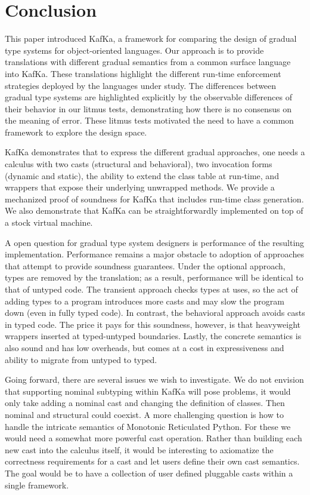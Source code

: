 \documentclass[a4paper,USenglish]{lipics-v2018}
\newcommand{\kafka}{{\sf KafKa}\xspace}
\newcounter{lem}
\begin{document}
\section{Conclusion}

This paper introduced \kafka, a framework for comparing the design of
gradual type systems for object-oriented languages. Our approach is to provide
translations with different gradual semantics from a common surface language
into \kafka. These translations highlight the different run-time enforcement
strategies deployed by the languages under study. The differences between
gradual type systems are highlighted explicitly by the observable differences
of their behavior in our litmus tests, demonstrating how there is no consensus
on the meaning of error. These litmus tests motivated the need to have a
common framework to explore the design space.

\kafka demonstrates that to express the different gradual approaches, one
needs a calculus with two casts (structural and behavioral), two
invocation forms (dynamic and static), the ability to extend the
class table at run-time, and wrappers that expose their underlying
unwrapped methods. We provide a mechanized proof of soundness for \kafka
that includes run-time class generation. We also demonstrate that \kafka
can be straightforwardly implemented on top of a stock virtual machine.

\enlargethispage{-1\baselineskip}
A open question for gradual type system designers is performance of the
resulting implementation. Performance remains a major obstacle to adoption
of approaches that attempt to provide soundness guarantees. Under the
optional approach, types are removed by the translation; as a result,
performance will be identical to that of untyped code. The transient
approach checks types at uses, so the act of adding types to a program
introduces more casts and may slow the program down (even in fully typed code). 
In contrast, the behavioral approach avoids casts in
typed code. The price it pays for this soundness, however, is that heavyweight
wrappers inserted at typed-untyped boundaries. Lastly, the concrete
semantics is also sound and has low overheads, but comes at a cost in
expressiveness and ability to migrate from untyped to typed.

Going forward, there are several issues we wish to investigate. We do not
envision that supporting nominal subtyping within \kafka will pose problems,
it would only take adding a nominal cast and changing the definition of
classes. Then nominal and structural could coexist. A more challenging
question is how to handle the intricate semantics of Monotonic Reticulated
Python. For these we would need a somewhat more powerful cast operation.
Rather than building each new cast into the calculus itself, it would be
interesting to axiomatize the correctness requirements for a cast and let
users define their own cast semantics. The goal would be to have a
collection of user defined pluggable casts within a single framework.




\end{document}
